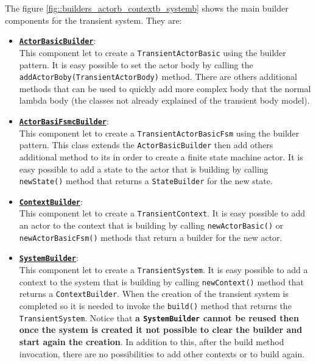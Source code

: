 The figure \ref{fig::builders_actorb_contextb_systemb} shows the main builder components for the transient system. They are:
\begin{itemize}
	\item 	\href{https://github.com/LM-96/QA-Extensions/blob/main/it.unibo.qakactor/src/main/kotlin/builders/ActorBasicBuilder.kt}{\underline{\textbf{\texttt{ActorBasicBuilder}}}}:\\
	This component let to create a \texttt{TransientActorBasic} using the builder pattern. It is easy possible to set the actor body by calling the \verb*|addActorBoby(TransientActorBody)| method. There are others additional methods that can be used to quickly add  more complex body that the normal lambda body (the classes not already explained of the transient body model).
	
	\item 	\href{https://github.com/LM-96/QA-Extensions/blob/main/it.unibo.qakactor/src/main/kotlin/builders/ActorBasicFsmBuilder.kt}{\underline{\textbf{\texttt{ActorBasiFsmcBuilder}}}}:\\
	This component let to create a \texttt{TransientActorBasicFsm} using the builder pattern. This class extends the \texttt{ActorBasicBuilder} then add others additional method to its in order to create a finite state machine actor. It is easy possible to add a state to the actor that is building by calling \verb*|newState()| method that returns a \texttt{StateBuilder} for the new state.
	
	\item 	\href{https://github.com/LM-96/QA-Extensions/blob/main/it.unibo.qakactor/src/main/kotlin/builders/ContextBuilder.kt}{\underline{\textbf{\texttt{ContextBuilder}}}}:\\
	This component let to create a \texttt{TransientContext}. It is easy possible to add an actor to the context that is building by calling \verb*|newActorBasic()| or \verb*|newActorBasicFsm()| methods that return a builder for the new actor.
	
	\item 	\href{https://github.com/LM-96/QA-Extensions/blob/main/it.unibo.qakactor/src/main/kotlin/builders/SystemBuilder.kt}{\underline{\textbf{\texttt{SystemBuilder}}}}:\\
	This component let to create a \texttt{TransientSystem}. It is easy possible to add a context to the system that is building by calling \verb*|newContext()| method that returns a \texttt{ContextBuilder}. When the creation of the transient system is completed so it is needed to invoke the \verb*|build()| method that returns the \texttt{TransientSystem}. Notice that \textbf{a \texttt{SystemBuilder} cannot be reused then once the system is created it not possible to clear the builder and start again the creation}. In addition to this, after the build method invocation, there are no possibilities to add other contexts or to build again.
\end{itemize}

